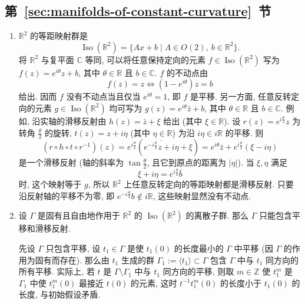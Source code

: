 \subsection{\texorpdfstring{第~\ref{sec:manifolds-of-constant-curvature}~节}{常曲率流形}}\label{subsec:solutions-manifolds-of-constant-curvature}

\begin{description}[font=\normalfont,leftmargin=2em,labelwidth=1.5em]
\begin{enumerate}[label=(\alph*),ref=\alph*,leftmargin=*]
\item $\mathbb{R}^2$ 的等距映射群是
\[
  \operatorname{Iso}(\mathbb{R}^2)=\{Ax+b\mid A\in O(2),\ b\in\mathbb{R}^2\}.
\]
将 $\mathbb{R}^2$ 与复平面 $\mathbb{C}$ 等同, 可以将任意保持定向的元素 $f\in\operatorname{Iso}(\mathbb{R}^2)$ 写为 $f(z)=e^{i\theta}z+b$, 其中 $\theta\in\mathbb{R}$ 且 $b\in\mathbb{C}$. $f$ 的不动点由
\[
  f(z)=z\iff(1-e^{i\theta})z=b
\]
给出. 因而 $f$ 没有不动点当且仅当 $e^{i\theta}=1$, 即 $f$ 是平移. 另一方面, 任意反转定向的元素 $g\in\operatorname{Iso}(\mathbb{R}^2)$ 均可写为 $g(z)=e^{i\theta}\bar z+b$, 其中 $\theta\in\mathbb{R}$ 且 $b\in\mathbb{C}$. 例如, 沿实轴的滑移反射由 $h(z)=\bar z+\xi$ 给出 (其中 $\xi\in\mathbb{R}$). 设 $r(z)=e^{i\frac{\theta}{2}}z$ 为转角 $\frac{\theta}{2}$ 的旋转, $t(z)=z+i\eta$ (其中 $\eta\in\mathbb{R}$) 为沿 $i\eta\in i\mathbb{R}$ 的平移. 则
\[
  (r\circ h\circ t\circ r^{-1})(z)
  =e^{i\frac{\theta}{2}}\left(\overline{e^{-i\frac{\theta}{2}}z+i\eta}+\xi\right)
  =e^{i\theta}\bar z+e^{i\frac{\theta}{2}}(\xi-i\eta)
\]
是一个滑移反射 (轴的斜率为 $\tan\frac{\theta}{2}$, 且它到原点的距离为 $|\eta|$). 当 $\xi,\eta$ 满足
\[
  \xi+i\eta=e^{i\frac{\theta}{2}}\bar b
\]
时, 这个映射等于 $g$, 所以 $\mathbb{R}^2$ 上任意反转定向的等距映射都是滑移反射. 只要沿反射轴的平移不为零, 即 $e^{-i\frac{\theta}{2}}b\notin i\mathbb{R}$, 这些映射显然没有不动点.
\item 设 $\Gamma$ 是固有且自由地作用于 $\mathbb{R}^2$ 的 $\operatorname{Iso}(\mathbb{R}^2)$ 的离散子群. 那么 $\Gamma$ 只能包含平移和滑移反射.

先设 $\Gamma$ 只包含平移, 设 $t_1\in\Gamma$ 是使 $t_1(0)$ 的长度最小的 $\Gamma$ 中平移 (因 $\Gamma$ 的作用为固有而存在). 那么由 $t_1$ 生成的群 $\Gamma_1:=\langle t_1\rangle\subset\Gamma$ 包含 $\Gamma$ 中与 $t_1$ 同方向的所有平移. 实际上, 若 $t$ 是 $\Gamma\setminus\Gamma_1$ 中与 $t_1$ 同方向的平移, 则取 $m\in\mathbb{Z}$ 使 $t_1^m$ 是 $\Gamma_1$ 中使 $t_1^m(0)$ 最接近 $t(0)$ 的元素, 这时 $t^{-1}t_1^m(0)$ 的长度小于 $t_1(0)$ 的长度, 与初始假设矛盾.


\end{enumerate}
\end{description}

